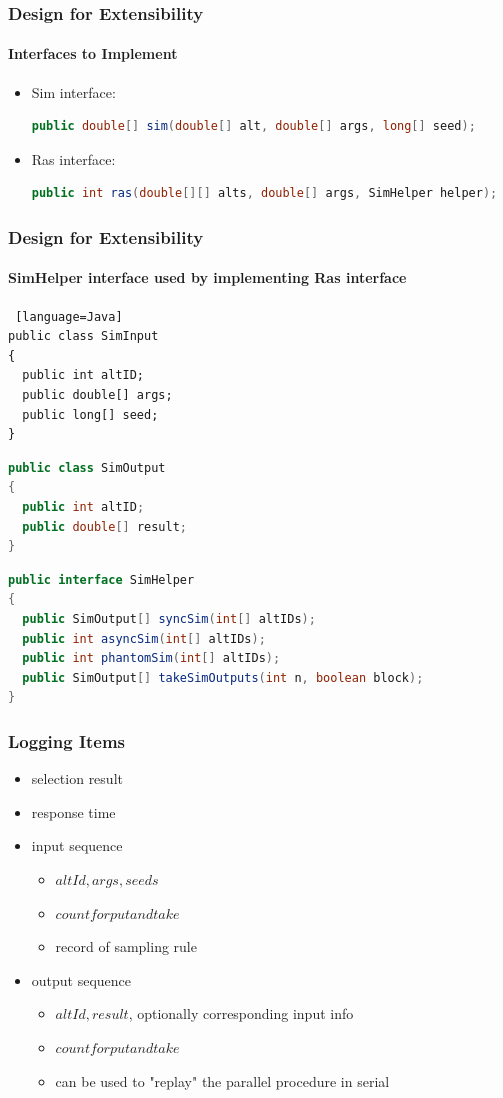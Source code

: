 \documentclass{beamer}
\begin{document}
\begin{frame}[fragile]
\frametitle{Design for Extensibility}
\framesubtitle{Interfaces to Implement}
\begin{itemize}
\item Sim interface:
\begin{lstlisting}[language=Java]
public double[] sim(double[] alt, double[] args, long[] seed);
\end{lstlisting}
\vspace{\baselineskip}
\item Ras interface:
\begin{lstlisting}[language=Java]
public int ras(double[][] alts, double[] args, SimHelper helper);
\end{lstlisting}
\end{itemize}
\end{frame}

\begin{frame}[fragile]
\frametitle{Design for Extensibility}
\framesubtitle{SimHelper interface used by implementing Ras interface}
\begin{lstlisting} [language=Java]
public class SimInput
{
  public int altID;
  public double[] args;
  public long[] seed;
}
\end{lstlisting}
\begin{lstlisting}[language=Java]
public class SimOutput
{
  public int altID;
  public double[] result;
}
\end{lstlisting}
\begin{lstlisting}[language=Java]
public interface SimHelper
{
  public SimOutput[] syncSim(int[] altIDs);
  public int asyncSim(int[] altIDs);
  public int phantomSim(int[] altIDs);
  public SimOutput[] takeSimOutputs(int n, boolean block);
}
\end{lstlisting}
\end{frame}

\begin{frame}
\frametitle{Logging Items}
\begin{itemize}
\item selection result
\item response time
\item input sequence
\begin{itemize}
\item $altId, args, seeds$
\item $count for put and take$
\item record of sampling rule
\end{itemize}
\item output sequence
\begin{itemize}
\item $altId, result$, optionally corresponding input info
\item $count for put and take$
\item can be used to "replay" the parallel procedure in serial
\end{itemize}
\end{itemize}
\end{frame}
\end{document}
